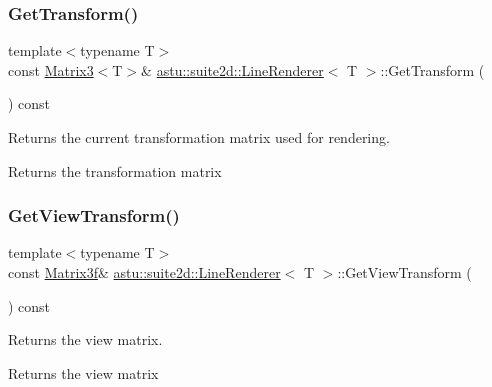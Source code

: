 \subsubsection{\texorpdfstring{Get\+Transform()}{GetTransform()}}
{\footnotesize\ttfamily template$<$typename T$>$ \\
const \hyperlink{classastu_1_1Matrix3}{Matrix3}$<$T$>$\& \hyperlink{classastu_1_1suite2d_1_1LineRenderer}{astu\+::suite2d\+::\+Line\+Renderer}$<$ T $>$\+::Get\+Transform (\begin{DoxyParamCaption}{ }\end{DoxyParamCaption}) const\hspace{0.3cm}{\ttfamily [inline]}}

Returns the current transformation matrix used for rendering.

\begin{DoxyReturn}{Returns}
the transformation matrix 
\end{DoxyReturn}
\mbox{\label{classastu_1_1suite2d_1_1LineRenderer_a6eee1abb8404e36f2310eb80a88ee340}} 
\subsubsection{\texorpdfstring{Get\+View\+Transform()}{GetViewTransform()}}
{\footnotesize\ttfamily template$<$typename T$>$ \\
const \hyperlink{classastu_1_1Matrix3}{Matrix3f}\& \hyperlink{classastu_1_1suite2d_1_1LineRenderer}{astu\+::suite2d\+::\+Line\+Renderer}$<$ T $>$\+::Get\+View\+Transform (\begin{DoxyParamCaption}{ }\end{DoxyParamCaption}) const\hspace{0.3cm}{\ttfamily [inline]}}

Returns the view matrix.

\begin{DoxyReturn}{Returns}
the view matrix 
\end{DoxyReturn}
\mbox{\label{classastu_1_1suite2d_1_1LineRenderer_a8571273df1940b8d2059e88abc7e4d5a}} 
